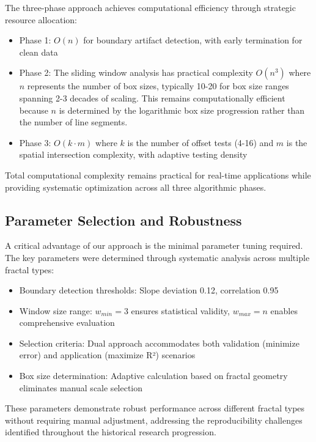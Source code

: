 \documentclass[preprint,12pt]{elsarticle}
\def\textbf#1{#1}%
\begin{document}
The three-phase approach achieves computational efficiency through strategic resource allocation:

\begin{itemize}
\item \textbf{Phase 1}: $O(n)$ for boundary artifact detection, with early termination for clean data

\item \textbf{Phase 2}: The sliding window analysis has practical complexity $O(n^3)$ where $n$ represents the number of box sizes, typically 10-20 for box size ranges spanning 2-3 decades of scaling. This remains computationally efficient because $n$ is determined by the logarithmic box size progression rather than the number of line segments.

\item \textbf{Phase 3}: $O(k \cdot m)$ where $k$ is the number of offset tests (4-16) and $m$ is the spatial intersection complexity, with adaptive testing density
\end{itemize}

Total computational complexity remains practical for real-time applications while providing systematic optimization across all three algorithmic phases.

\subsection{Parameter Selection and Robustness}

A critical advantage of our approach is the minimal parameter tuning required. The key parameters were determined through systematic analysis across multiple fractal types:

\begin{itemize}
\item \textbf{Boundary detection thresholds}: Slope deviation 0.12, correlation 0.95
\item \textbf{Window size range}: $w_{min} = 3$ ensures statistical validity, $w_{max} = n$ enables comprehensive evaluation
\item \textbf{Selection criteria}: Dual approach accommodates both validation (minimize error) and application (maximize R²) scenarios
\item \textbf{Box size determination}: Adaptive calculation based on fractal geometry eliminates manual scale selection
\end{itemize}

These parameters demonstrate robust performance across different fractal types without requiring manual adjustment, addressing the reproducibility challenges identified throughout the historical research progression.
\end{document}
